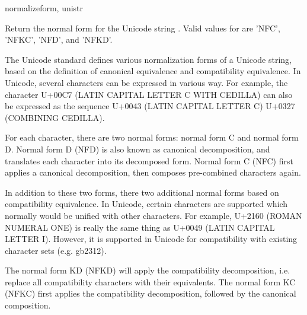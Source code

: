 \begin{funcdesc}{normalize}{form, unistr}

Return the normal form  for the Unicode string .
Valid values for  are 'NFC', 'NFKC', 'NFD', and 'NFKD'.

The Unicode standard defines various normalization forms of a Unicode
string, based on the definition of canonical equivalence and
compatibility equivalence. In Unicode, several characters can be
expressed in various way. For example, the character U+00C7 (LATIN
CAPITAL LETTER C WITH CEDILLA) can also be expressed as the sequence
U+0043 (LATIN CAPITAL LETTER C) U+0327 (COMBINING CEDILLA).

For each character, there are two normal forms: normal form C and
normal form D. Normal form D (NFD) is also known as canonical
decomposition, and translates each character into its decomposed form.
Normal form C (NFC) first applies a canonical decomposition, then
composes pre-combined characters again.

In addition to these two forms, there two additional normal forms
based on compatibility equivalence. In Unicode, certain characters are
supported which normally would be unified with other characters. For
example, U+2160 (ROMAN NUMERAL ONE) is really the same thing as U+0049
(LATIN CAPITAL LETTER I). However, it is supported in Unicode for
compatibility with existing character sets (e.g. gb2312).

The normal form KD (NFKD) will apply the compatibility decomposition,
i.e. replace all compatibility characters with their equivalents. The
normal form KC (NFKC) first applies the compatibility decomposition,
followed by the canonical composition.

\end{funcdesc}

